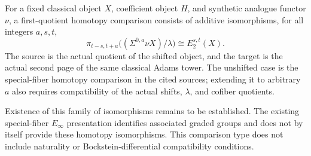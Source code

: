 \begin{definition}
  \label{def:synthetic-first-quotient-homotopy-comparison}
  \leanok
  For a fixed classical object $X$, coefficient object $H$, and synthetic
  analogue functor $\nu$, a first-quotient homotopy comparison consists of
  additive isomorphisms, for all integers $a,s,t$,
  \[
    \pi_{t-s,t+a}\bigl((\Sigma^{0,a}\nu X)/\lambda\bigr)
       \cong E_2^{s,t}(X).
  \]
  The source is the actual quotient of the shifted object, and the target
  is the actual second page of the same classical Adams tower.
  The unshifted case is the special-fiber homotopy comparison in the
  cited sources; extending it to arbitrary $a$ also requires compatibility
  of the actual shifts, $\lambda$, and cofiber quotients.

  Existence of this family of isomorphisms remains to be established.
  The existing special-fiber $E_\infty$ presentation identifies associated
  graded groups and does not by itself provide these homotopy isomorphisms.
  This comparison type does not include naturality or Bockstein-differential
  compatibility conditions.
\end{definition}

